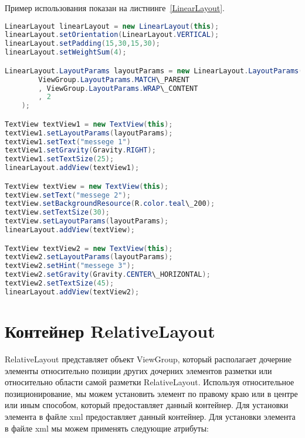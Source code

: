 Пример использования показан на листнинге~\ref{LinearLayout}.

\begin{lstlisting}[language=Java
	, caption=\leftline{Программное создание LinearLayout}
	, label=LinearLayout
	]
LinearLayout linearLayout = new LinearLayout(this);
linearLayout.setOrientation(LinearLayout.VERTICAL);
linearLayout.setPadding(15,30,15,30);
linearLayout.setWeightSum(4);

LinearLayout.LayoutParams layoutParams = new LinearLayout.LayoutParams(
		ViewGroup.LayoutParams.MATCH\_PARENT
		, ViewGroup.LayoutParams.WRAP\_CONTENT
		, 2
	);

TextView textView1 = new TextView(this);
textView1.setLayoutParams(layoutParams);
textView1.setText("messege 1")
textView1.setGravity(Gravity.RIGHT);
textView1.setTextSize(25);
linearLayout.addView(textView1);

TextView textView = new TextView(this);
textView.setText("messege 2");
textView.setBackgroundResource(R.color.teal\_200);
textView.setTextSize(30);
textView.setLayoutParams(layoutParams);
linearLayout.addView(textView);

TextView textView2 = new TextView(this);
textView2.setLayoutParams(layoutParams);
textView2.setHint("messege 3");
textView2.setGravity(Gravity.CENTER\_HORIZONTAL);
textView2.setTextSize(45);
linearLayout.addView(textView2);
\end{lstlisting}

\section{Контейнер RelativeLayout}
RelativeLayout представляет объект ViewGroup, который располагает 
дочерние элементы относительно позиции других дочерних элементов 
разметки или относительно области самой разметки RelativeLayout. 
Используя относительное позиционирование, мы можем установить элемент 
по правому краю или в центре или иным способом, который предоставляет 
данный контейнер. Для установки элемента в файле xml предоставляет 
данный контейнер. Для установки элемента в файле xml мы можем 
применять следующие атрибуты:


